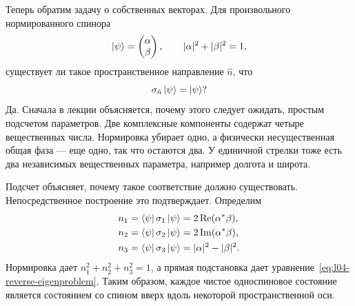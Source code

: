 Теперь обратим задачу о собственных векторах. Для произвольного нормированного спинора
\begin{equation}
  \left\lvert\psi\right\rangle=
  \begin{pmatrix}\alpha\\\beta\end{pmatrix},
  \qquad
  |\alpha|^2+|\beta|^2=1,
  \label{eq:l04-general-spinor}
\end{equation}
существует ли такое пространственное направление \(\hat n\), что
\begin{equation}
  \sigma_{\hat n}\left\lvert\psi\right\rangle=\left\lvert\psi\right\rangle?
  \label{eq:l04-reverse-eigenproblem}
\end{equation}
Да. Сначала в лекции объясняется, почему этого следует ожидать, простым подсчетом параметров. Две комплексные компоненты содержат четыре вещественных числа. Нормировка убирает одно, а физически несущественная общая фаза — еще одно, так что остаются два. У единичной стрелки тоже есть два независимых вещественных параметра, например долгота и широта.

\begin{classroomqa}
\end{classroomqa}

\begin{classroomqa}
\end{classroomqa}

Подсчет объясняет, почему такое соответствие должно существовать. Непосредственное построение это подтверждает. Определим
\begin{align}
  n_1&=\left\langle\psi\right\rvert\sigma_1\left\lvert\psi\right\rangle
      =2\operatorname{Re}(\alpha^*\beta),
  \notag\\
  n_2&=\left\langle\psi\right\rvert\sigma_2\left\lvert\psi\right\rangle
      =2\operatorname{Im}(\alpha^*\beta),
  \notag\\
  n_3&=\left\langle\psi\right\rvert\sigma_3\left\lvert\psi\right\rangle
      =|\alpha|^2-|\beta|^2.
  \label{eq:l04-bloch-components}
\end{align}
Нормировка дает \(n_1^2+n_2^2+n_3^2=1\), а прямая подстановка дает уравнение~\eqref{eq:l04-reverse-eigenproblem}. Таким образом, каждое чистое односпиновое состояние является состоянием со спином вверх вдоль некоторой пространственной оси.

